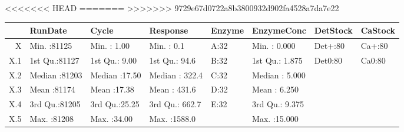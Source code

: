 <<<<<<< HEAD
=======
>>>>>>> 9729e67d0722a8b3800932d902fa4528a7da7e22
\begin{table}[ht]
\centering
\begin{tabular}{rlllllll}
  \hline
 &    RunDate &     Cycle &    Response & Enzyme &   EnzymeConc & DetStock & CaStock \\ 
  \hline
X & Min.   :81125   & Min.   : 1.00   & Min.   :   0.1   & A:32   & Min.   : 0.000   & Det+:80   & Ca+:80   \\ 
  X.1 & 1st Qu.:81127   & 1st Qu.: 9.00   & 1st Qu.:  94.6   & B:32   & 1st Qu.: 1.875   & Det0:80   & Ca0:80   \\ 
  X.2 & Median :81203   & Median :17.50   & Median : 322.4   & C:32   & Median : 5.000   &  &  \\ 
  X.3 & Mean   :81174   & Mean   :17.38   & Mean   : 431.6   & D:32   & Mean   : 6.250   &  &  \\ 
  X.4 & 3rd Qu.:81205   & 3rd Qu.:25.25   & 3rd Qu.: 662.7   & E:32   & 3rd Qu.: 9.375   &  &  \\ 
  X.5 & Max.   :81208   & Max.   :34.00   & Max.   :1588.0   &  & Max.   :15.000   &  &  \\ 
   \hline
\end{tabular}
\end{table}
